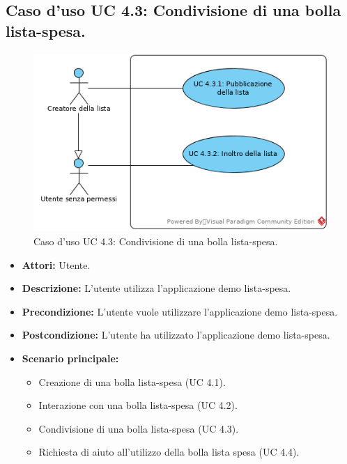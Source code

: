 \subsection{Caso d'uso UC 4.3: Condivisione di una bolla lista-spesa.}
\label{Caso d'uso UC 4.3: Condivisione di una bolla lista-spesa.}
\begin{figure}[ht]
	\centering
	\includegraphics[scale=0.60]{Usecases/img/UC4.3.png}
	\caption{Caso d'uso UC 4.3: Condivisione di una bolla lista-spesa.}
\end{figure}

\FloatBarrier
\begin{itemize}
\item \textbf{Attori:} Utente.
\item \textbf{Descrizione:} L'utente utilizza l'applicazione demo lista-spesa.
\item \textbf{Precondizione:} L'utente vuole utilizzare l'applicazione demo lista-spesa. 
\item \textbf{Postcondizione:} L'utente ha utilizzato l'applicazione demo lista-spesa.
\item \textbf{Scenario principale:}
	\begin{itemize}
	\item{Creazione di una bolla lista-spesa (UC 4.1).}
	\item{Interazione con una bolla lista-spesa (UC 4.2).}
	\item{Condivisione di una bolla lista-spesa (UC 4.3).}
	\item{Richiesta di aiuto all'utilizzo della bolla lista spesa (UC 4.4).}
	\end{itemize}
\end{itemize}